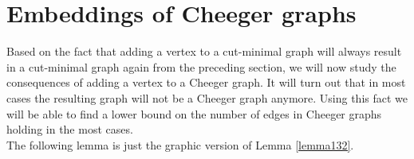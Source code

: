
\section{Embeddings of Cheeger graphs}

Based on the fact that adding a vertex to a cut-minimal graph will always result in a cut-minimal graph again from the preceding section, we will now study the consequences of adding a vertex to a Cheeger graph. It will turn out that in most cases the resulting graph will not be a Cheeger graph anymore. Using this fact we will be able to find a lower bound on the number of edges in Cheeger graphs holding in the most cases.\\
The following lemma is just the graphic version of Lemma \ref{lemma132}.


